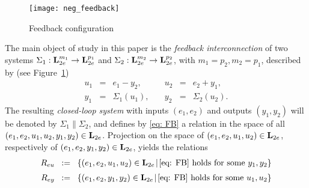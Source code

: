 \documentclass[11pt]{article}
\newcommand{\Ltwoe}{\boldsymbol{\rm L}_{2e}}
\begin{document}
\setlength{\unitlength}{0.7cm}
\begin{figure}[h]
  \centering 
  \texttt{[image: neg\_feedback]}
  \caption{Feedback configuration} \label{fig: feedback}
\end{figure}

The main object of study in this paper is the {\it feedback interconnection} of two systems $\Sigma_1 : \Ltwoe^{m_1} \to \Ltwoe^{p_1}$ and $\Sigma_2 : \Ltwoe^{m_2} \to \Ltwoe^{p_2}$, with $m_1=p_2, m_2=p_1$, described by (see Figure~\ref{fig: feedback})
\begin{equation} \label{eq: FB}
\begin{array}{rcllll}
 u_1 & = & e_1 - y_2, \quad & u_2 &= &e_2 + y_1, \\[2mm]
 y_1 & = & \Sigma_1(u_1), \quad & y_2 &= &\Sigma_2(u_2).
\end{array}
\end{equation}
The resulting {\it closed-loop system} with inputs $(e_1,e_2)$ and outputs $(y_1,y_2)$ will be denoted by $\Sigma_1 \| \Sigma_2$, and defines by \eqref{eq: FB} a relation in the space of all $(e_1,e_2,u_1,u_2,y_1,y_2) \in \Ltwoe$. Projection on the space of $(e_1,e_2,u_1,u_2) \in \Ltwoe$, respectively of $(e_1,e_2,y_1,y_2) \in \Ltwoe$, yields the relations
\[
\begin{array}{rcl}
R_{eu} \! &:= & \! \{(e_1,e_2,u_1,u_2) \in \Ltwoe \! \mid \! \eqref{eq: FB} \mbox{ holds for some } y_1,y_2\} \\[2mm]
R_{ey} \! &:= & \! \{(e_1,e_2,y_1,y_2) \in \Ltwoe \! \mid \! \eqref{eq: FB} \mbox{ holds for some } u_1,u_2\}
\end{array}
\]
\end{document}
